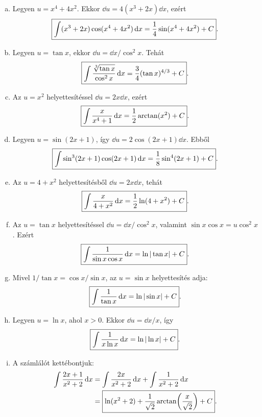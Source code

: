 \documentclass{szb-solution}
\begin{document}
\begin{enumerate}[a)]
  \item Legyen $u=x^4+4x^2$. Ekkor
        $\dd u=4(x^3+2x)\dd x$, ezért
        $$
          \boxed{\int(x^3+2x)\cos(x^4+4x^2)\mathop{}\!\mathrm{d} x
          =\frac14\sin(x^4+4x^2)+C}
          \text.
        $$

  \item Legyen $u=\tan x$, ekkor $\dd u=\dd x/\cos^2x$. Tehát
        $$
          \boxed{\int\frac{\sqrt[3]{\tan x}}{\cos^2x}\mathop{}\!\mathrm{d} x
          =\frac34(\tan x)^{4/3}+C}
          \text.
        $$

  \item Az $u=x^2$ helyettesítéssel $\dd u=2x\dd x$, ezért
        $$
          \boxed{\int\frac{x}{x^4+1}\mathop{}\!\mathrm{d} x
          =\frac12\arctan(x^2)+C}
          \text.
        $$

  \item Legyen $u=\sin(2x+1)$, így
        $\dd u=2\cos(2x+1)\dd x$. Ebből
        $$
          \boxed{\int\sin^3(2x+1)\cos(2x+1)\mathop{}\!\mathrm{d} x
          =\frac18\sin^4(2x+1)+C}
          \text.
        $$

  \item Az $u=4+x^2$ helyettesítésből $\dd u=2x\dd x$, tehát
        $$
          \boxed{\int\frac{x}{4+x^2}\mathop{}\!\mathrm{d} x
          =\frac12\ln(4+x^2)+C}
          \text.
        $$

  \item Az $u=\tan x$ helyettesítéssel
        $\dd u=\dd x/\cos^2x$, valamint
        $\sin x\cos x=u\cos^2x$. Ezért
        $$
          \boxed{\int\frac{1}{\sin x\cos x}\mathop{}\!\mathrm{d} x
          =\ln|\tan x|+C}
          \text.
        $$

  \item Mivel $1/\tan x=\cos x/\sin x$, az $u=\sin x$ helyettesítés adja:
        $$
          \boxed{\int\frac1{\tan x}\mathop{}\!\mathrm{d} x=\ln|\sin x|+C}
          \text.
        $$

  \item Legyen $u=\ln x$, ahol $x>0$. Ekkor $\dd u=\dd x/x$, így
        $$
          \boxed{\int\frac1{x\ln x}\mathop{}\!\mathrm{d} x=\ln|\ln x|+C}
          \text.
        $$

  \item A számlálót kettébontjuk:
        \begin{align*}
          \int\frac{2x+1}{x^2+2}\mathop{}\!\mathrm{d} x
          &=\int\frac{2x}{x^2+2}\mathop{}\!\mathrm{d} x
            +\int\frac1{x^2+2}\mathop{}\!\mathrm{d} x\\
          &=\boxed{\ln(x^2+2)
            +\frac1{\sqrt2}\arctan\!\left(\frac{x}{\sqrt2}\right)+C}
          \text.
        \end{align*}
\end{enumerate}
\end{document}
